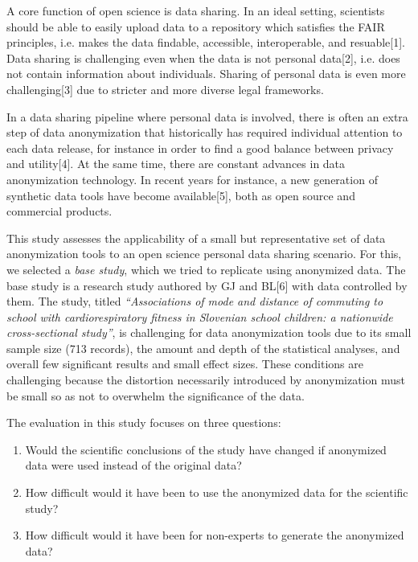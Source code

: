 \documentclass[10pt]{article}
\newcommand{\mycite}[1]{[#1]}
\begin{document}
A core function of open science is data sharing. In an ideal setting, scientists should be able to easily upload data to a repository which satisfies the FAIR principles, i.e. makes the data findable, accessible, interoperable, and resuable\mycite{1}. Data sharing is challenging even when the data is not personal data\mycite{2}, i.e. does not contain information about individuals. Sharing of personal data is even more challenging\mycite{3} due to stricter and more diverse legal frameworks.

In a data sharing pipeline where personal data is involved, there is often an extra step of data anonymization that historically has required individual attention to each data release, for instance in order to find a good balance between privacy and utility\mycite{4}. At the same time, there are constant advances in data anonymization technology. In recent years for instance, a new generation of synthetic data tools have become available\mycite{5}, both as open source and commercial products.

This study assesses the applicability of a small but representative set of data anonymization tools to an open science personal data sharing scenario. For this, we selected a \textit{base study}, which we tried to replicate using anonymized data. The base study is a research study authored by GJ and BL\mycite{6} with data controlled by them. The study, titled \textit{``Associations of mode and distance of commuting to school with cardiorespiratory fitness in Slovenian school children: a nationwide cross-sectional study''}, is challenging for data anonymization tools due to its small sample size (713 records), the amount and depth of the statistical analyses, and overall few significant results and small effect sizes. These conditions are challenging because the distortion necessarily introduced by anonymization must be small so as not to overwhelm the significance of the data.

The evaluation in this study focuses on three questions:

\begin{enumerate}
    \item Would the scientific conclusions of the study have changed if anonymized data were used instead of the original data?
    \item How difficult would it have been to use the anonymized data for the scientific study?
    \item How difficult would it have been for non-experts to generate the anonymized data?
\end{enumerate}
\end{document}

